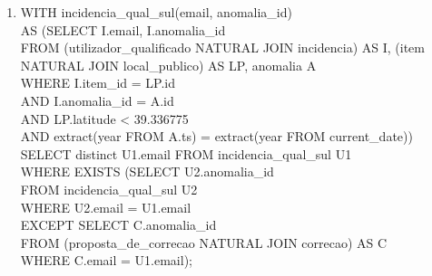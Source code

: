 \documentclass[12pt]{report}
\begin{document}
\begin{enumerate}
        \item WITH incidencia\_qual\_sul(email, anomalia\_id)\\
              AS (SELECT I.email, I.anomalia\_id \\
              FROM (utilizador\_qualificado NATURAL JOIN incidencia) AS I, (item NATURAL JOIN local\_publico) AS LP, anomalia A \\
              \hspace*{1em} WHERE I.item\_id = LP.id \\
              \hspace*{1em} AND I.anomalia\_id = A.id \\
              \hspace*{1em} AND LP.latitude < 39.336775\\
              \hspace*{1em} AND extract(year FROM A.ts) = extract(year FROM current\_date))\\
              SELECT distinct U1.email FROM incidencia\_qual\_sul U1 \\
              WHERE EXISTS (SELECT U2.anomalia\_id \\
              FROM incidencia\_qual\_sul U2 \\
              WHERE U2.email = U1.email \\
              EXCEPT SELECT C.anomalia\_id \\
              FROM (proposta\_de\_correcao NATURAL JOIN correcao) AS C \\
              WHERE C.email = U1.email);
        
    \end{enumerate}
\end{document}
